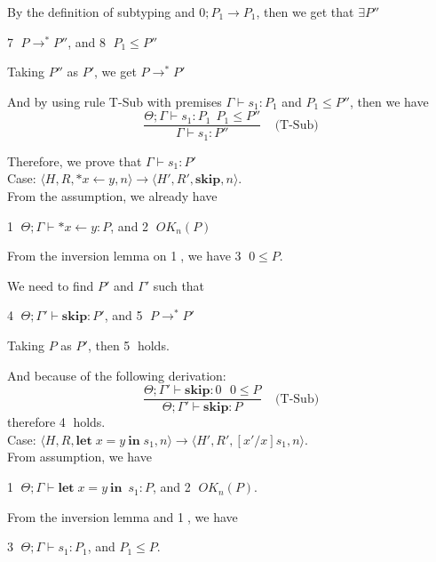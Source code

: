 \documentclass[english]{jssst_ppl} %
\newcommand\LET{\mathbf{let}\;}
\newcommand\IN{\mathbf{in}\;}
\newcommand\SKIP{\mathbf{skip}}
\newcommand\Rtab{\; \; \; \;}
\begin{document}
By the definition of subtyping and $0;P_{1} \rightarrow P_{1}$, then we get that $\exists P''$
\begin{center}
 \textcircled{7} $P \rightarrow^{*} P''$, and \textcircled{8} $P_{1} \le P''$
\end{center}

Taking $P''$ as  $P'$, we get $P \rightarrow^{*} P'$

And by using rule T-Sub with premises $\Gamma \vdash s_{1} : P_{1}$ and $P_{1} \le P''$, then we have 
$$
    \frac{\Theta; \Gamma \vdash s_{1} : P_{1} \  \  P_{1} \le P''}
    {\Gamma \vdash s_{1} : P''}
    \Rtab \mbox{(T-Sub)}
$$

Therefore, we prove that $\Gamma \vdash s_{1} : P'$ \\

\noindent Case: $\langle H, R, *x \leftarrow y , n \rangle \rightarrow  \langle H', R', \SKIP, n  \rangle $. \\

From the assumption, we already have
\begin{center}
\textcircled{1} $\Theta; \Gamma \vdash *x \leftarrow y : P$, and \textcircled{2} $OK_{n}(P)$
\end{center}

From the inversion lemma on \textcircled{1}, we have \textcircled{3} $0 \le P$.

We need to find $P'$ and $\Gamma'$ such that
\begin{center}
 \textcircled{4} $\Theta; \Gamma' \vdash \SKIP: P'$, and \textcircled{5} $P \rightarrow^{*} P'$
\end{center}

Taking $P$ as $P'$, then \textcircled{5} holds.

And because of the following derivation:
$$
  \frac{\Theta; \Gamma' \vdash \SKIP: 0 \ \ \ 0 \le P}
   {\Theta;\Gamma' \vdash \SKIP : P}
  \Rtab \mbox{(T-Sub)}
$$
therefore \textcircled{4} holds. \\

\noindent Case: $\langle H, R, \LET x = y\  \IN s_{1} , n \rangle \rightarrow  \langle H', R', [x'/x]s_{1}, n  \rangle $. \\

From assumption, we have 
\begin{center}
\textcircled{1} $\Theta; \Gamma \vdash \LET x = y\  \IN \  s_{1} : P$, and \textcircled{2} $OK_{n}(P)$.
\end{center}

From the inversion lemma and \textcircled{1}, we have 
\begin{center}
\textcircled{3} $\Theta; \Gamma \vdash s_{1} : P_{1}$, and $P_{1} \le P$.
\end{center}
\end{document}
